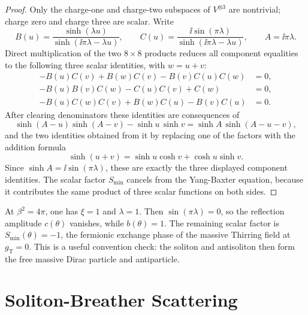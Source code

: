 \begin{proof}
Only the charge-one and charge-two subspaces of \(V^{\otimes3}\) are
nontrivial; charge zero and charge three are scalar.  Write
\[
  B(u)=\frac{\sinh(\lambda u)}
            {\sinh(\ii\pi\lambda-\lambda u)},
  \qquad
  C(u)=\frac{\ii\sin(\pi\lambda)}
            {\sinh(\ii\pi\lambda-\lambda u)},
  \qquad
  A=\ii\pi\lambda .
\]
Direct multiplication of the two \(8\times8\) products reduces all component
equalities to the following three scalar identities, with \(w=u+v\):
\[
\begin{aligned}
  -B(u)C(v)+B(w)C(v)-B(v)C(u)C(w)&=0,\\
  -B(u)B(v)C(w)-C(u)C(v)+C(w)&=0,\\
  -B(u)C(w)C(v)+B(w)C(u)-B(v)C(u)&=0 .
\end{aligned}
\]
After clearing denominators these identities are consequences of
\[
  \sinh(A-u)\sinh(A-v)-\sinh u\,\sinh v
  =
  \sinh A\,\sinh(A-u-v),
\]
and the two identities obtained from it by replacing one of the factors with
the addition formula
\[
  \sinh(u+v)=\sinh u\cosh v+\cosh u\sinh v .
\]
Since \(\sinh A=\ii\sin(\pi\lambda)\), these are exactly the three displayed
component identities.  The scalar factor \(S_{\mathrm{min}}\) cancels from the
Yang-Baxter equation, because it contributes the same product of three scalar
functions on both sides.
\end{proof}

\begin{remark}
At \(\beta^2=4\pi\), one has \(\xi=1\) and \(\lambda=1\).  Then
\(\sin(\pi\lambda)=0\), so the reflection amplitude \(c(\theta)\) vanishes,
while \(b(\theta)=1\).  The remaining scalar factor is
\(S_{\mathrm{min}}(\theta)=-1\), the fermionic exchange phase of the massive
Thirring field at \(g_{\mathrm T}=0\).  This is a useful convention check:
the soliton and antisoliton then form the free massive Dirac particle and
antiparticle.
\end{remark}

\section{Soliton-Breather Scattering}

